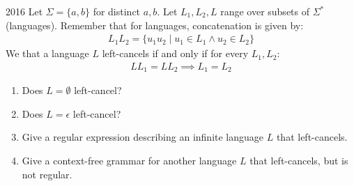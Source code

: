 
\begin{exercise}{2016}
  Let \(\Sigma = \{a, b\}\) for distinct \(a, b\). Let \(L_1, L_2, L\) range
  over subsets of \(\Sigma^*\) (languages). Remember that for languages,
  concatenation is given by:
  \begin{gather*}
    L_1L_2 = \{u_1u_2 \mid u_1 \in L_1 \land u_2 \in L_2\}
  \end{gather*}
  We that a language \(L\) left-cancels if and only if for every \(L_1, L_2\):
  \begin{gather*}
    LL_1 = LL_2 \implies L_1 = L_2
  \end{gather*}

  \begin{enumerate}
    \item Does \(L = \emptyset\) left-cancel? 
    \item Does \(L = \epsilon\) left-cancel? 
    \item Give a regular expression describing an infinite language \(L\) that left-cancels. 
    \item Give a context-free grammar for another language \(L\) that
    left-cancels, but is not regular. 
  \end{enumerate}
\end{exercise}

